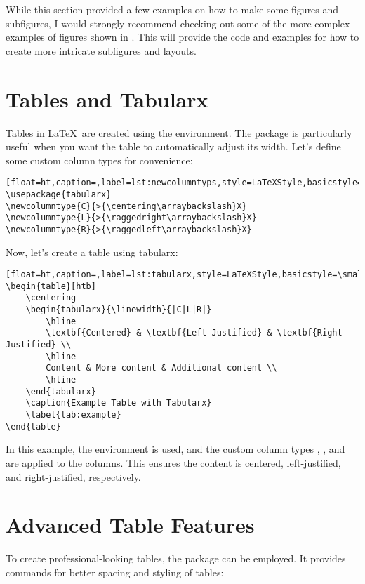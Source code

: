 		While this section provided a few examples on how to make some figures and subfigures, I would strongly recommend checking out some of the more complex examples of figures shown in .
		This will provide the code and examples for how to create more intricate subfigures and layouts.
		
	\section{Tables and Tabularx}
		Tables in \LaTeX\ are created using the  environment. 
		The  package is particularly useful when you want the table to automatically adjust its width. 
		Let's define some custom column types for convenience:

		\begin{lstlisting}[float=ht,caption=,label=lst:newcolumntyps,style=LaTeXStyle,basicstyle=\small\ttfamily,]
\usepackage{tabularx}
\newcolumntype{C}{>{\centering\arraybackslash}X}
\newcolumntype{L}{>{\raggedright\arraybackslash}X}
\newcolumntype{R}{>{\raggedleft\arraybackslash}X}
		\end{lstlisting}
Now, let's create a table using tabularx:
\begin{lstlisting}[float=ht,caption=,label=lst:tabularx,style=LaTeXStyle,basicstyle=\small\ttfamily,]
\begin{table}[htb]
	\centering
	\begin{tabularx}{\linewidth}{|C|L|R|}
		\hline
		\textbf{Centered} & \textbf{Left Justified} & \textbf{Right Justified} \\
		\hline
		Content & More content & Additional content \\
		\hline
	\end{tabularx}
	\caption{Example Table with Tabularx}
	\label{tab:example}
\end{table}
		\end{lstlisting}

		In this example, the  environment is used, and the custom column types , , and  are applied to the columns. 
		This ensures the content is centered, left-justified, and right-justified, respectively.

	\section{Advanced Table Features}

		To create professional-looking tables, the  package can be employed. 
		It provides commands for better spacing and styling of tables:

